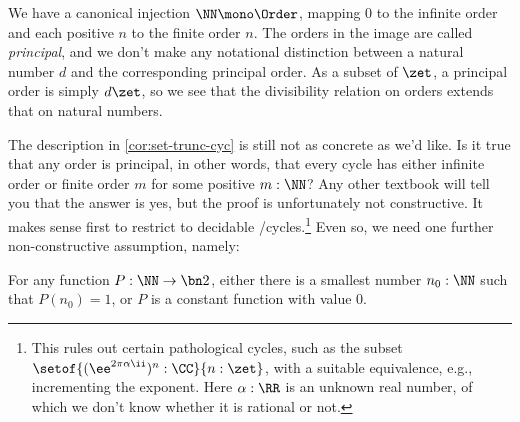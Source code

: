 We have a canonical injection $\NN \mono \Order$,
mapping $0$ to the infinite order and each positive $n$ to the finite order $n$.
The orders in the image are called \emph{principal},
and we don't make any notational distinction between a natural number $d$
and the corresponding principal order.
As a subset of $\zet$, a principal order is simply $d\zet$,
so we see that the divisibility relation on orders extends that on natural numbers.

The description in \cref{cor:set-trunc-cyc} is still not as concrete as we'd like.
Is it true that any order is principal, in other words,
that every cycle has either infinite order or finite order $m$
for some positive $m:\NN$?
Any other textbook will tell you that the answer is yes,
but the proof is unfortunately not constructive.
It makes sense first to restrict to decidable \coverings/cycles.\footnote{%
  This rules out certain pathological cycles,
  such as the subset $\setof{(\ee^{2\pi\alpha\ii})^n:\CC}{n:\zet}$,
  with a suitable equivalence, e.g., incrementing the exponent.
  Here $\alpha:\RR$ is an unknown real number,
  of which we don't know whether it is rational or not.}
Even so, we need one further non-constructive assumption, namely:

\begin{principle}
  \label{LPO}
  For any function $P:\NN\to\bn 2$, 
  either there is a smallest number $n_0:\NN$ such that $P(n_0)=1$,
  or $P$ is a constant function with value $0$.
\end{principle}


